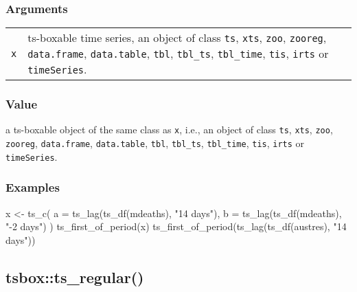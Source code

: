\documentclass[
  letterpaper,
  DIV=11,
  numbers=noendperiod]{scrreport}
\newenvironment{Shaded}{\begin{snugshade}}{\end{snugshade}}
\newcommand{\AttributeTok}[1]{\textcolor[rgb]{0.40,0.45,0.13}{#1}}
\newcommand{\FunctionTok}[1]{\textcolor[rgb]{0.28,0.35,0.67}{#1}}
\newcommand{\NormalTok}[1]{\textcolor[rgb]{0.00,0.23,0.31}{#1}}
\newcommand{\OtherTok}[1]{\textcolor[rgb]{0.00,0.23,0.31}{#1}}
\newcommand{\StringTok}[1]{\textcolor[rgb]{0.13,0.47,0.30}{#1}}
\begin{document}
\subsubsection{Arguments}\label{arguments-9}

\begin{longtable}[]{@{}ll@{}}
\toprule\noalign{}
\endhead
\bottomrule\noalign{}
\endlastfoot
\texttt{x} & ts-boxable time series, an object of class \texttt{ts},
\texttt{xts}, \texttt{zoo}, \texttt{zooreg}, \texttt{data.frame},
\texttt{data.table}, \texttt{tbl}, \texttt{tbl\_ts}, \texttt{tbl\_time},
\texttt{tis}, \texttt{irts} or \texttt{timeSeries}. \\
\end{longtable}

\subsubsection{Value}\label{value-9}

a ts-boxable object of the same class as \texttt{x}, i.e., an object of
class \texttt{ts}, \texttt{xts}, \texttt{zoo}, \texttt{zooreg},
\texttt{data.frame}, \texttt{data.table}, \texttt{tbl},
\texttt{tbl\_ts}, \texttt{tbl\_time}, \texttt{tis}, \texttt{irts} or
\texttt{timeSeries}.

\subsubsection{Examples}\label{examples-9}

\begin{Shaded}
\begin{Highlighting}[]
\NormalTok{x }\OtherTok{\textless{}{-}} \FunctionTok{ts\_c}\NormalTok{(}
  \AttributeTok{a =} \FunctionTok{ts\_lag}\NormalTok{(}\FunctionTok{ts\_df}\NormalTok{(mdeaths), }\StringTok{"14 days"}\NormalTok{),}
  \AttributeTok{b =} \FunctionTok{ts\_lag}\NormalTok{(}\FunctionTok{ts\_df}\NormalTok{(mdeaths), }\StringTok{"{-}2 days"}\NormalTok{)}
\NormalTok{)}
\FunctionTok{ts\_first\_of\_period}\NormalTok{(x)}
\FunctionTok{ts\_first\_of\_period}\NormalTok{(}\FunctionTok{ts\_lag}\NormalTok{(}\FunctionTok{ts\_df}\NormalTok{(austres), }\StringTok{"14 days"}\NormalTok{))}
\end{Highlighting}
\end{Shaded}

\subsection{tsbox::ts\_regular()}\label{tsboxts_regular}
\end{document}
